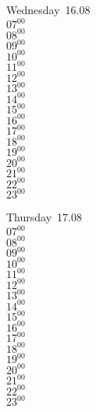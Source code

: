 \documentclass[11pt, a4paper]{book}\usepackage[]{graphicx}\usepackage[]{color}
\begin{document}
\begin{weekdaybox}
  Wednesday~16.08\\
  { 
  \vfill
  $07^{00}$\\
$08^{00}$\\
$09^{00}$\\
$10^{00}$\\
$11^{00}$\\
$12^{00}$\\
$13^{00}$\\
$14^{00}$\\
$15^{00}$\\
$16^{00}$\\
$17^{00}$\\
$18^{00}$\\
$19^{00}$\\
$20^{00}$\\
$21^{00}$\\
$22^{00}$\\
$23^{00}$\\
  }
\end{weekdaybox}
\clearpage
\begin{headerbox}
\end{headerbox}
\begin{weekdaybox}
  Thursday~17.08\\
  { 
  \vfill
  $07^{00}$\\
$08^{00}$\\
$09^{00}$\\
$10^{00}$\\
$11^{00}$\\
$12^{00}$\\
$13^{00}$\\
$14^{00}$\\
$15^{00}$\\
$16^{00}$\\
$17^{00}$\\
$18^{00}$\\
$19^{00}$\\
$20^{00}$\\
$21^{00}$\\
$22^{00}$\\
$23^{00}$\\
  }
\end{weekdaybox} 
\end{document}
